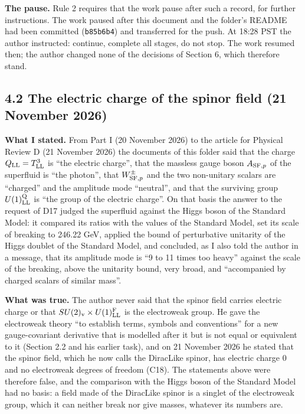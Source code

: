 \documentclass[
  10pt,
]{article}
\begin{document}
\textbf{The pause.} Rule 2 requires that the work pause after such a
record, for further instructions. The work paused after this document
and the folder's README had been committed (\texttt{b85b6b4}) and
transferred for the push. At 18:28 PST the author instructed: continue,
complete all stages, do not stop. The work resumed then; the author
changed none of the decisions of Section 6, which therefore stand.

\hypertarget{the-electric-charge-of-the-spinor-field-21-november-2026}{%
\subsection{4.2 The electric charge of the spinor field (21 November
2026)}\label{the-electric-charge-of-the-spinor-field-21-november-2026}}

\textbf{What I stated.} From Part I (20 November 2026) to the article
for Physical Review D (21 November 2026) the documents of this folder
said that the charge \(Q_{\rm LL}=T^3_{\rm LL}\) is ``the electric
charge'', that the massless gauge boson \(A_{{\rm SF},p}\) of the
superfluid is ``the photon'', that \(W^\pm_{{\rm SF},p}\) and the two
non-unitary scalars are ``charged'' and the amplitude mode ``neutral'',
and that the surviving group \(U(1)^{\rm Q}_{\rm LL}\) is ``the group of
the electric charge''. On that basis the answer to the request of D17
judged the superfluid against the Higgs boson of the Standard Model: it
compared its ratios with the values of the Standard Model, set its scale
of breaking to 246.22 GeV, applied the bound of perturbative unitarity
of the Higgs doublet of the Standard Model, and concluded, as I also
told the author in a message, that its amplitude mode is ``9 to 11 times
too heavy'' against the scale of the breaking, above the unitarity
bound, very broad, and ``accompanied by charged scalars of similar
mass''.

\textbf{What was true.} The author never said that the spinor field
carries electric charge or that
\(SU(2)_{\rm v}\times U(1)^{\rm F}_{\rm LL}\) is the electroweak group.
He gave the electroweak theory ``to establish terms, symbols and
conventions'' for a new gauge-covariant derivative that is modelled
after it but is not equal or equivalent to it (Section 2.2 and his
earlier task), and on 21 November 2026 he stated that the spinor field,
which he now calls the DiracLike spinor, has electric charge 0 and no
electroweak degrees of freedom (C18). The statements above were
therefore false, and the comparison with the Higgs boson of the Standard
Model had no basis: a field made of the DiracLike spinor is a singlet of
the electroweak group, which it can neither break nor give masses,
whatever its numbers are.
\end{document}

